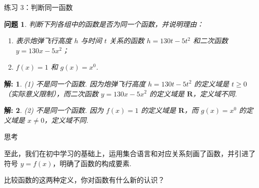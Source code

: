 \documentclass[aspectratio=169,13pt,t] {beamer}
\newtheorem{question}{问题}
\newtheorem*{solve}{解:}
\theoremstyle{definition}
\begin{document}
\begin{frame}{练习 3：判断同一函数}
	\begin{question}
	判断下列各组中的函数是否为同一个函数，并说明理由：
	\begin{enumerate}[(1)]
		\item 表示炮弹飞行高度 \(h\) 与时间 \(t\) 关系的函数 \(h = 130t - 5t^2\) 和二次函数 \(y = 130x - 5x^2\)；
		\item \(f(x) = 1\) 和 \(g(x) = x^0\).
	\end{enumerate}
	\end{question}
	\pause
	\begin{solve}
		(1) 不是同一个函数. 因为炮弹飞行高度 \(h = 130t - 5t^2\) 的定义域是 \(t \geqslant 0\)（实际意义限制），而二次函数 \(y = 130x - 5x^2\) 的定义域是 \(\mathbf{R}\)，定义域不同.
	\end{solve}
	\pause
	\begin{solve}
		(2) 不是同一个函数. 因为 \(f(x) = 1\) 的定义域是 \(\mathbf{R}\)，而 \(g(x) = x^0\) 的定义域是 \(x \neq 0\)，定义域不同.
	\end{solve}
\end{frame}

\begin{frame}{思考}
	\begin{summarybox}[思考]
		至此，我们在初中学习的基础上，运用集合语言和对应关系刻画了函数，并引进了符号 \(y = f(x)\)，明确了函数的构成要素.
		
		比较函数的这两种定义，你对函数有什么新的认识？
	\end{summarybox}
\end{frame}
\end{document}
